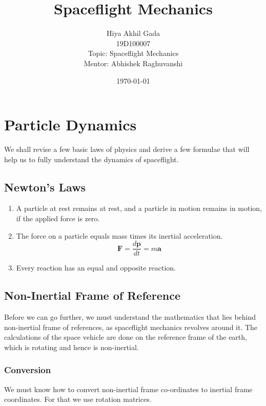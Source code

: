 \documentclass{article}
\title{Spaceflight Mechanics}
\author{
  Hiya Akhil Gada\\
  19D100007\\
  Topic: Spaceflight Mechanics\\
  Mentor: Abhishek Raghuvanshi\\
}
\date{\today}
\theoremstyle{definition}
\begin{document}
\maketitle
\tableofcontents

\section{Particle Dynamics}

We shall revise a few basic laws of physics and derive a few formulae that will help us to fully understand the dynamics of spaceflight.

\subsection{Newton's Laws}

\begin{enumerate}
    \item A particle at rest remains at rest, and a particle in motion remains in motion, if the applied force is zero.
    \item The force on a particle equals mass times its inertial acceleration.
    \[\boldsymbol{F}= \frac{d\boldsymbol{p}}{dt} = m\boldsymbol{a}\]
    \item Every reaction has an equal and opposite reaction. 
\end{enumerate}





\subsection{Non-Inertial Frame of Reference}

Before we can go further, we must understand the mathematics that lies behind non-inertial frame of references, as spaceflight mechanics revolves around it. The calculations of the space vehicle are done on the reference frame of the earth, which is rotating and hence is non-inertial.

\subsubsection{Conversion}
We must know how to convert non-inertial frame co-ordinates to inertial frame coordinates. For that we use rotation matrices.
\end{document}
